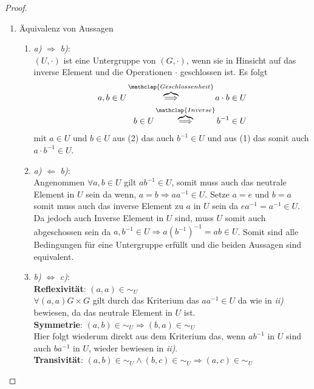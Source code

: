 \documentclass{../problemset}
\begin{document}
\begin{problem}
\begin{proof}
	\begin{enumerate}
		\item Äquivalenz von Aussagen
		      \begin{enumerate}[label=\alph*)]
			      \item \textit{a)} $\Longrightarrow$ \textit{b)}: \\
			            $(U, \cdot)$ ist eine Untergruppe von $(G, \cdot)$, wenn sie in Hinsicht auf das inverse Element und die Operationen $\cdot$ geschlossen ist.
			            Es folgt \begin{align}
				            a, b \in U \overbrace{\Longrightarrow}^{\mathclap{Geschlossenheit}} a \cdot b \in U \\
				            b \in U \overbrace{\Longrightarrow}^{\mathclap{Inverse}} b^{-1} \in U
			            \end{align} mit $a \in U$ und $b \in U$ aus (2) das auch $b^{-1} \in U$ und aus (1) das somit auch $a \cdot b^{-1} \in U$.
			            \checkmark
			      \item \textit{a)} $\Longleftarrow$ \textit{b)}: \\
			            Angenommen $\forall a,b \in U$ gilt $ab^{-1} \in U$, somit muss auch das neutrale Element in $U$ sein da wenn, $a=b \Longrightarrow aa^{-1} \in U$.
			            Setze $a=e$ und $b=a$ somit muss auch das inverse Element zu $a$ in $U$ sein da $ea^{-1} = a^{-1} \in U$.
			            Da jedoch auch Inverse Element in $U$ sind, muss $U$ somit auch abgeschossen sein da $a,b^{-1} \in U \Longrightarrow a{(b^{-1})}^{-1} = ab \in U$.
			            Somit sind alle Bedingungen für eine Untergruppe erfüllt und die beiden Aussagen sind equivalent.
			      \item \textit{b)} $\Longleftrightarrow$ \textit{c)}: \\
			            \textbf{Reflexivität}: $(a, a) \in \sim_U$ \\
			            $\forall (a,a) G \times G$ gilt durch das Kriterium das $aa^{-1} \in U$ da wie in \textit{ii)} bewiesen, da das neutrale Element in $U$ ist.
			            \checkmark \\
			            \textbf{Symmetrie}: $(a, b) \in \sim_U \Longrightarrow (b,a) \in \sim_U$ \\
			            Hier folgt wiederum direkt aus dem Kriterium das, wenn $ab^{-1}$ in $U$ sind auch $ba^{-1}$ in $U$, wieder bewiesen in \textit{ii)}.
			            \checkmark \\
			            \textbf{Transivität}: $(a, b) \in \sim_U \land (b,c) \in \sim_U \Longrightarrow (a,c) \in \sim_U$ \\

\end{enumerate}
\end{enumerate}
\end{proof}
\end{problem}
\end{document}

